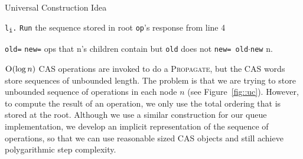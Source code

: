 \documentclass[10pt]{article}
\theoremstyle{definition}
\begin{document}
\begin{algorithm}
\caption{Universal Construction Idea}\label{alg1}
\begin{algorithmic}[1]
\begin{multicols}{2}

\State \texttt{l\textsubscript{i}.}
\State {}
\State \texttt{Run} \textsf{the sequence stored in root}
\State \texttt{\Return op}\textsf{'s response from line 4}

\Statex

 \Return
{}
\State {} \EndIf
\State {}

\columnbreak

\State \texttt{old=} 
\State \texttt{new=} \textsf{ops that n's children contain but \texttt{old} does not}
\State \texttt{new= old$\cdot$new}
\State \Return n.

\end{multicols}
\end{algorithmic}
\end{algorithm}


$\textsc{O}(\log n)$ CAS operations are invoked to do a \textsc{Propagate}, but the CAS words store sequences of unbounded length.
The problem is that we are trying to store unbounded sequence of operations in each node $n$ (see Figure~\ref{fig::uc}). However, to compute the result of an operation, we only use the total ordering that is stored at the root. Although we use a similar construction for our queue implementation, we develop an implicit representation of the sequence of operations, so that we can use reasonable sized CAS objects and still achieve polygarithmic step complexity.
\end{document}
